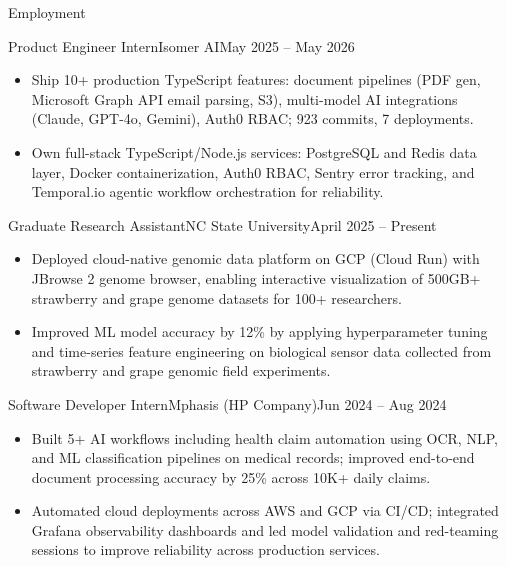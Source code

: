 \documentclass[]{mcdowellcv}
\begin{document}
\makeheader

\begin{cvsection}{Employment}
  \begin{cvsubsection}{Product Engineer Intern}{Isomer AI}{May 2025 -- May 2026}
    \begin{itemize}
      \item Ship 10+ production TypeScript features: document pipelines (PDF gen, Microsoft Graph API email parsing, S3), multi-model AI integrations (Claude, GPT-4o, Gemini), Auth0 RBAC; 923 commits, 7 deployments.
      \item Own full-stack TypeScript/Node.js services: PostgreSQL and Redis data layer, Docker containerization, Auth0 RBAC, Sentry error tracking, and Temporal.io agentic workflow orchestration for reliability.
    \end{itemize}
    \vspace{-1.5pt}
  \end{cvsubsection}

  \begin{cvsubsection}{Graduate Research Assistant}{NC State University}{April 2025 -- Present}
    \begin{itemize}
      \item Deployed cloud-native genomic data platform on GCP (Cloud Run) with JBrowse 2 genome browser, enabling interactive visualization of 500GB+ strawberry and grape genome datasets for 100+ researchers.
      \item Improved ML model accuracy by 12\% by applying hyperparameter tuning and time-series feature engineering on biological sensor data collected from strawberry and grape genomic field experiments.
    \end{itemize}
    \vspace{-1.5pt}
  \end{cvsubsection}

  \begin{cvsubsection}{Software Developer Intern}{Mphasis (HP Company)}{Jun 2024 -- Aug 2024}
    \begin{itemize}
      \item Built 5+ AI workflows including health claim automation using OCR, NLP, and ML classification pipelines on medical records; improved end-to-end document processing accuracy by 25\% across 10K+ daily claims.
      \item Automated cloud deployments across AWS and GCP via CI/CD; integrated Grafana observability dashboards and led model validation and red-teaming sessions to improve reliability across production services.
    \end{itemize}
    \vspace{-1.5pt}
  \end{cvsubsection}


\end{cvsection}
\end{document}

